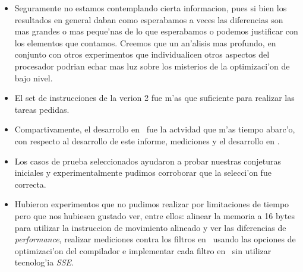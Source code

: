 \begin{itemize}
\item Seguramente no estamos contemplando cierta informacion, pues si bien los resultados en general daban como esperabamos a veces las diferencias son mas grandes o mas peque'nas de lo que esperabamos o podemos justificar con los elementos que contamos. Creemos que un an'alisis mas profundo, en conjunto con otros experimentos que individualicen otros aspectos del procesador podrian echar mas luz sobre los misterios de la optimizaci'on de bajo nivel. 

\item El set de instrucciones de la verion 2 fue m'as que suficiente para realizar las tareas pedidas.

\item Compartivamente, el desarrollo en \ass \ fue la actvidad que m'as tiempo abarc'o, con respecto al desarrollo de este informe, mediciones y
el desarrollo en \C.

\item Los casos de prueba seleccionados ayudaron a probar nuestras conjeturas iniciales y experimentalmente pudimos corroborar 
que la selecci'on fue correcta.

\item Hubieron experimentos que no pudimos realizar por limitaciones de tiempo pero que nos hubiesen gustado ver, entre ellos: alinear la memoria a 16 bytes para utilizar la instruccion de movimiento alineado y ver las diferencias de \textit{performance}, realizar mediciones contra los filtros en \C \ usando las opciones de optimizaci'on del compilador e implementar cada filtro en \ass \ sin utilizar tecnolog'ia \textit{SSE}.  
\end{itemize}
